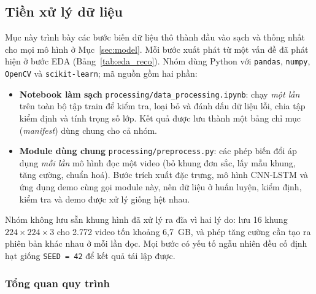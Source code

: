 
\subsection{Tiền xử lý dữ liệu}
\label{sec:preprocess}

Mục này trình bày các bước biến dữ liệu thô thành đầu vào sạch và thống nhất cho mọi mô hình ở Mục~\ref{sec:model}. Mỗi bước xuất phát từ một vấn đề đã phát hiện ở bước EDA (Bảng~\ref{tab:eda_reco}). Nhóm dùng Python với \texttt{pandas}, \texttt{numpy}, \texttt{OpenCV} và \texttt{scikit-learn}; mã nguồn gồm hai phần:

\begin{itemize}
  \item \textbf{Notebook làm sạch} \texttt{processing/data\_processing.ipynb}: chạy \emph{một lần} trên toàn bộ tập train để kiểm tra, loại bỏ và đánh dấu dữ liệu lỗi, chia tập kiểm định và tính trọng số lớp. Kết quả được lưu thành một bảng chỉ mục (\textit{manifest}) dùng chung cho cả nhóm.
  \item \textbf{Module dùng chung} \texttt{processing/preprocess.py}: các phép biến đổi áp dụng \emph{mỗi lần} mô hình đọc một video (bỏ khung đơn sắc, lấy mẫu khung, tăng cường, chuẩn hoá). Bước trích xuất đặc trưng, mô hình CNN-LSTM và ứng dụng demo cùng gọi module này, nên dữ liệu ở huấn luyện, kiểm định, kiểm tra và demo được xử lý giống hệt nhau.
\end{itemize}

Nhóm không lưu sẵn khung hình đã xử lý ra đĩa vì hai lý do: lưu 16 khung $224\times224\times3$ cho 2.772 video tốn khoảng 6,7~GB, và phép tăng cường cần tạo ra phiên bản khác nhau ở mỗi lần đọc. Mọi bước có yếu tố ngẫu nhiên đều cố định hạt giống \texttt{SEED = 42} để kết quả tái lập được.

\subsubsection{Tổng quan quy trình}
\label{subsec:pp_overview}

